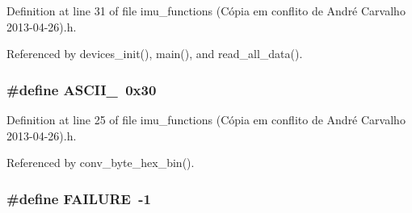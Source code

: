 Definition at line 31 of file imu\-\_\-functions (\-Cópia em conflito de André Carvalho 2013-\/04-\/26).\-h.



Referenced by devices\-\_\-init(), main(), and read\-\_\-all\-\_\-data().

\hypertarget{imu__functions_01_07C_xC3_xB3pia_01em_01conflito_01de_01Andr_xC3_xA9_01Carvalho_012013-04-26_08_8h_aa3f75ad2972ec8996ce5206feac0e52c}{
\subsubsection[{A\-S\-C\-I\-I\-\_\-0}]{\setlength{\rightskip}{0pt plus 5cm}\#define A\-S\-C\-I\-I\-\_~0x30}}\label{imu__functions_01_07C_xC3_xB3pia_01em_01conflito_01de_01Andr_xC3_xA9_01Carvalho_012013-04-26_08_8h_aa3f75ad2972ec8996ce5206feac0e52c}


Definition at line 25 of file imu\-\_\-functions (\-Cópia em conflito de André Carvalho 2013-\/04-\/26).\-h.



Referenced by conv\-\_\-byte\-\_\-hex\-\_\-bin().

\hypertarget{imu__functions_01_07C_xC3_xB3pia_01em_01conflito_01de_01Andr_xC3_xA9_01Carvalho_012013-04-26_08_8h_a6d58f9ac447476b4e084d7ca383f5183}{
\subsubsection[{F\-A\-I\-L\-U\-R\-E}]{\setlength{\rightskip}{0pt plus 5cm}\#define F\-A\-I\-L\-U\-R\-E~-\/1}}\label{imu__functions_01_07C_xC3_xB3pia_01em_01conflito_01de_01Andr_xC3_xA9_01Carvalho_012013-04-26_08_8h_a6d58f9ac447476b4e084d7ca383f5183}


